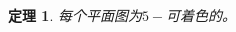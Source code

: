 \documentclass{article}
\begin{document}
\begin{CJK}{UTF8}{gbsn}
  \newtheorem*{Thm}{定理}
  \huge
\begin{Thm}
 每个平面图为$5-$可着色的。  
\end{Thm}


\end{CJK}
\end{document}
